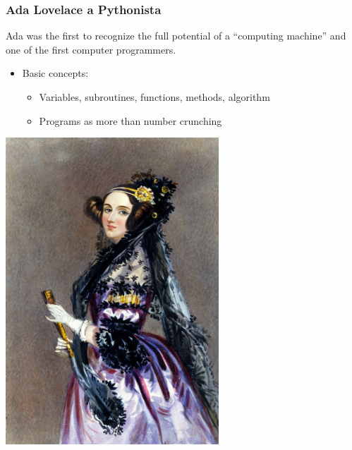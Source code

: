 \documentclass[compress, aspectratio=54]{beamer}
\begin{document}


\begin{frame}
\frametitle{Ada Lovelace a Pythonista}

 \begin{minipage}{0.5\textwidth}
 Ada was the first to recognize the full potential of a ``computing machine'' and one of the first computer programmers.
 \begin{itemize}

\item Basic concepts:
 \begin{itemize}
 \item Variables, subroutines, functions, methods, algorithm
 \item Programs as more than number crunching

  \end{itemize}

 \end{itemize}

 \end{minipage}%
\begin{minipage}{0.5\textwidth}
\begin{center}
    \includegraphics[width=0.6\textwidth]{Figures/Ada_Lovelace_portrait.jpg}
\end{center}
\end{minipage}
\end{frame}
\end{document}
